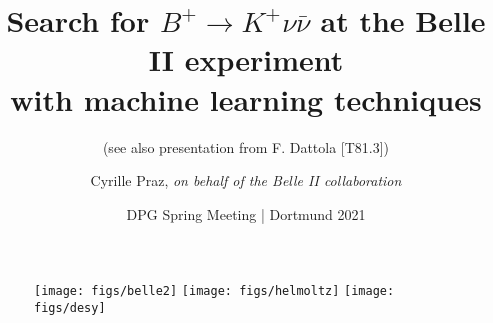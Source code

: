 \newcommand{\BKnn}{\ensuremath{B^+\to K^+\nu\bar{\nu}}\xspace}
\title[\BKnn at Belle II]{Search for \BKnn at the Belle II experiment \\ with machine learning techniques}
\subtitle{(see also presentation from F. Dattola [T81.3])}
\author[Cyrille Praz]{Cyrille Praz, \textit{on behalf of the Belle II collaboration}}
\date[18.03.2021]{DPG Spring Meeting | Dortmund 2021}
\begin{frame}
\begin{figure}
\begin{center}
\texttt{[image: figs/belle2]}
\hspace{0.5cm}
\texttt{[image: figs/helmoltz]}
\hspace{0.5cm}
\texttt{[image: figs/desy]}
\end{center}
\end{figure}
\vspace{-0.75cm}
\titlepage
\end{frame}
